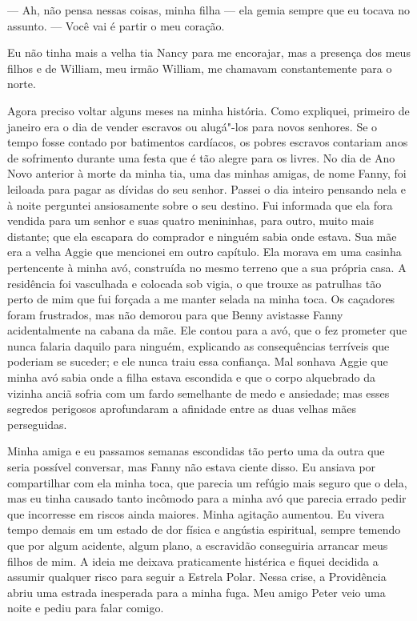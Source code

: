 --- Ah, não pensa nessas coisas, minha filha --- ela gemia sempre que eu
tocava no assunto. --- Você vai é partir o meu coração.

Eu não tinha mais a velha tia Nancy para me encorajar, mas a presença
dos meus filhos e de William, meu irmão William, me chamavam
constantemente para o norte.

Agora preciso voltar alguns meses na
minha história. Como expliquei, primeiro de janeiro era o dia de vender
escravos ou alugá"-los para novos senhores. Se o tempo fosse contado por
batimentos cardíacos, os pobres escravos contariam anos de sofrimento
durante uma festa que é tão alegre para os livres. No dia de Ano Novo
anterior à morte da minha tia, uma das minhas amigas, de nome Fanny, foi
leiloada para pagar as dívidas do seu senhor. Passei o dia inteiro
pensando nela e à noite perguntei ansiosamente sobre o seu destino. Fui
informada que ela fora vendida para um senhor e suas quatro menininhas,
para outro, muito mais distante; que ela escapara do comprador e ninguém
sabia onde estava. Sua mãe era a velha Aggie que mencionei em outro
capítulo. Ela morava em uma casinha pertencente à minha avó, construída
no mesmo terreno que a sua própria casa. A residência foi vasculhada e
colocada sob vigia, o que trouxe as patrulhas tão perto de mim que fui
forçada a me manter selada na minha toca. Os caçadores foram frustrados,
mas não demorou para que Benny avistasse Fanny acidentalmente na cabana
da mãe. Ele contou para a avó, que o fez prometer que nunca falaria
daquilo para ninguém, explicando as consequências terríveis que poderiam
se suceder; e ele nunca traiu essa confiança. Mal sonhava Aggie que
minha avó sabia onde a filha estava escondida e que o corpo alquebrado
da vizinha anciã sofria com um fardo semelhante de medo e ansiedade; mas
esses segredos perigosos aprofundaram a afinidade entre as duas velhas
mães perseguidas.

Minha amiga e eu passamos semanas
escondidas tão perto uma da outra que seria possível conversar, mas
Fanny não estava ciente disso. Eu ansiava por compartilhar com ela minha
toca, que parecia um refúgio mais seguro que o dela, mas eu tinha
causado tanto incômodo para a minha avó que parecia errado pedir que
incorresse em riscos ainda maiores. Minha agitação aumentou. Eu vivera
tempo demais em um estado de dor física e angústia espiritual, sempre
temendo que por algum acidente, algum plano, a escravidão conseguiria
arrancar meus filhos de mim. A ideia me deixava praticamente histérica e
fiquei decidida a assumir qualquer risco para seguir a Estrela Polar.
Nessa crise, a Providência abriu uma estrada inesperada para a minha
fuga. Meu amigo Peter veio uma noite e pediu para falar comigo.

